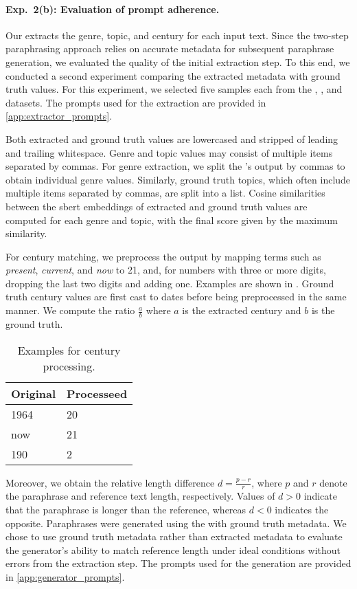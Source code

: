 \paragraph{Exp.\ 2(b): Evaluation of prompt adherence.}

Our \pextractor{} extracts the genre, topic, and century for each input text. 
Since the two-step paraphrasing approach relies on accurate metadata for subsequent paraphrase generation, we evaluated the quality of the initial extraction step. 
To this end, we conducted a second experiment comparing the extracted metadata with ground truth values. 
For this experiment, we selected five samples each from the \dataBlog{}, \dataGutenberg{}, and \dataStudent{} datasets.
The prompts used for the extraction are provided in \autoref{app:extractor_prompts}.

Both extracted and ground truth values are lowercased and stripped of leading and trailing whitespace. 
Genre and topic values may consist of multiple items separated by commas. 
For genre extraction, we split the \pextractor{}'s output by commas to obtain individual genre values. 
Similarly, ground truth topics, which often include multiple items separated by commas, are split into a list. 
Cosine similarities between the \ac{sbert} embeddings of extracted and ground truth values are computed for each genre and topic, with the final score given by the maximum similarity.

For century matching, we preprocess the \pextractor{} output by mapping terms such as \textit{present}, \textit{current}, and \textit{now} to 21, and, for numbers with three or more digits, dropping the last two digits and adding one. 
Examples are shown in . 
Ground truth century values are first cast to dates before being preprocessed in the same manner.
We compute the ratio $\frac{a}{b}$ where $a$ is the extracted century and $b$ is the ground truth.

\begin{table}[h]
\centering
\caption{Examples for century processing.}
\label{tab:examples_extract_century}
\begin{tabular}{@{}ll@{}}
    \toprule
\textbf{Original} & \textbf{Processeed} \\
\midrule
1964              & 20                  \\
now               & 21                  \\
190               & 2     \\
\bottomrule             
\end{tabular}%
\end{table}

Moreover, we obtain the relative length difference $d = \frac{p - r}{r}$, where $p$ and $r$ denote the paraphrase and reference text length, respectively. 
Values of $d > 0$ indicate that the paraphrase is longer than the reference, whereas $d < 0$ indicates the opposite.
Paraphrases were generated using the \pgenerator{} with ground truth metadata.
We chose to use ground truth metadata rather than extracted metadata to evaluate the generator's ability to match reference length under ideal conditions without errors from the extraction step.
The prompts used for the generation are provided in \autoref{app:generator_prompts}.
